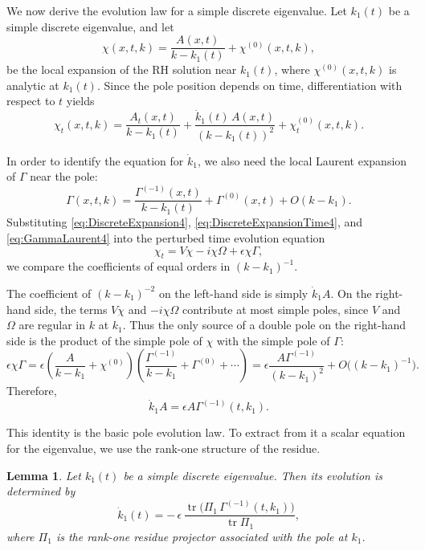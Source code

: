 \documentclass[11pt]{amsart}
\newtheorem{lemma}{Lemma}[section]
\theoremstyle{definition}
\numberwithin{equation}{section}
\begin{document}
We now derive the evolution law for a simple discrete eigenvalue. Let $k_1(t)$ be a simple discrete eigenvalue, and let
\begin{equation}
\chi(x,t,k)=\frac{A(x,t)}{k-k_1(t)}+\chi^{(0)}(x,t,k),
\label{eq:DiscreteExpansion4}
\end{equation}
be the local expansion of the RH solution near $k_1(t)$, where $\chi^{(0)}(x,t,k)$ is analytic at $k_1(t)$. Since the pole position depends on time, differentiation with respect to $t$ yields
\begin{equation}
\chi_t(x,t,k)=\frac{A_t(x,t)}{k-k_1(t)}+\frac{\dot{k}_1(t)\,A(x,t)}{(k-k_1(t))^2}+\chi_t^{(0)}(x,t,k).
\label{eq:DiscreteExpansionTime4}
\end{equation}

In order to identify the equation for $\dot{k}_1$, we also need the local Laurent expansion of $\Gamma$ near the pole:
\begin{equation}
\Gamma(x,t,k)=\frac{\Gamma^{(-1)}(x,t)}{k-k_1(t)}+\Gamma^{(0)}(x,t)+O(k-k_1).
\label{eq:GammaLaurent4}
\end{equation}
Substituting \eqref{eq:DiscreteExpansion4}, \eqref{eq:DiscreteExpansionTime4}, and \eqref{eq:GammaLaurent4} into the perturbed time evolution equation
\begin{equation}
\chi_t = V\chi - i\chi \Omega + \epsilon \chi \Gamma,
\label{eq:ChiTimeEvolution4}
\end{equation}
we compare the coefficients of equal orders in $(k-k_1)^{-1}$.

The coefficient of $(k-k_1)^{-2}$ on the left-hand side is simply $\dot{k}_1 A$. On the right-hand side, the terms $V\chi$ and $-i\chi\Omega$ contribute at most simple poles, since $V$ and $\Omega$ are regular in $k$ at $k_1$. Thus the only source of a double pole on the right-hand side is the product of the simple pole of $\chi$ with the simple pole of $\Gamma$:
\[
\epsilon \chi\Gamma
=
\epsilon\left(\frac{A}{k-k_1}+\chi^{(0)}\right)
\left(\frac{\Gamma^{(-1)}}{k-k_1}+\Gamma^{(0)}+\cdots\right)
=
\epsilon \frac{A\Gamma^{(-1)}}{(k-k_1)^2}+O\bigl((k-k_1)^{-1}\bigr).
\]
Therefore,
\begin{equation}
\dot{k}_1 A = \epsilon A\Gamma^{(-1)}(t,k_1).
\label{eq:Aeq4}
\end{equation}

This identity is the basic pole evolution law. To extract from it a scalar equation for the eigenvalue, we use the rank-one structure of the residue.

\begin{lemma}
Let $k_1(t)$ be a simple discrete eigenvalue. Then its evolution is determined by
\begin{equation}
\dot{k}_1(t) = -\,\epsilon\,\frac{\operatorname{tr}\bigl(\Pi_1\,\Gamma^{(-1)}(t,k_1)\bigr)}{\operatorname{tr}\Pi_1},
\label{eq:EigenvalueEvolution4}
\end{equation}
where $\Pi_1$ is the rank-one residue projector associated with the pole at $k_1$.
\end{lemma}
\end{document}
